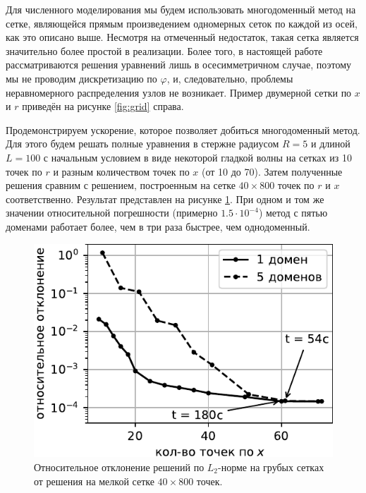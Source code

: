 \documentclass[12pt, a4paper]{report}
\begin{document}
Для численного моделирования мы будем использовать многодоменный метод на сетке, являющейся прямым произведением одномерных сеток по каждой из осей, как это описано выше. Несмотря на отмеченный недостаток, такая сетка является значительно более простой в реализации. Более того, в настоящей работе рассматриваются решения уравнений лишь в осесимметричном случае, поэтому мы не проводим дискретизацию по $\varphi$, и, следовательно, проблемы неравномерного распределения узлов не возникает. Пример двумерной сетки по $x$ и $r$ приведён на рисунке \ref{fig:grid} справа.

Продемонстрируем ускорение, которое позволяет добиться многодоменный метод. Для этого будем решать полные уравнения в стержне радиусом $R=5$ и длиной $L=100$ с начальным условием в виде некоторой гладкой волны на сетках из 10 точек по $r$ и разным количеством точек по $x$ (от 10 до 70). Затем полученные решения сравним с решением, построенным на сетке $40\times 800$ точек по $r$ и $x$ соответственно. Результат представлен на рисунке \ref{fig:error}. При одном и том же значении относительной погрешности (примерно $1.5\cdot 10^{-4}$) метод с пятью доменами работает более, чем в три раза быстрее, чем однодоменный.
\begin{figure}[h!]
	\centering
	\includegraphics[width=0.48\linewidth]{figures/ErrorBlack}
	\caption{Относительное отклонение решений по $L_2$-норме на грубых сетках от решения на мелкой сетке $40\times 800$ точек.}
	\label{fig:error}
\end{figure}




\end{document}
